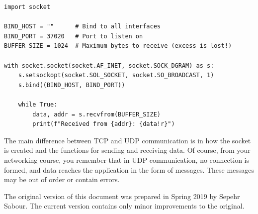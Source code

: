 \documentclass[]{article}
\begin{document}
  \begin{verbatim}
import socket

BIND_HOST = ""      # Bind to all interfaces
BIND_PORT = 37020   # Port to listen on
BUFFER_SIZE = 1024  # Maximum bytes to receive (excess is lost!)

with socket.socket(socket.AF_INET, socket.SOCK_DGRAM) as s:
    s.setsockopt(socket.SOL_SOCKET, socket.SO_BROADCAST, 1)
    s.bind((BIND_HOST, BIND_PORT))

    while True:
        data, addr = s.recvfrom(BUFFER_SIZE)
        print(f"Received from {addr}: {data!r}")
  \end{verbatim}

  The main difference between TCP and UDP communication is in how the socket is created and the functions for sending and receiving data.
  Of course, from your networking course, you remember that in UDP communication, no connection is formed, and data reaches the application in the form of messages.
  These messages may be out of order or contain errors.

  \vfill
  \begin{center}
  The original version of this document was prepared in Spring 2019 by Sepehr Sabour. The current version contains only minor improvements to the original.
  \end{center}
\end{document}
